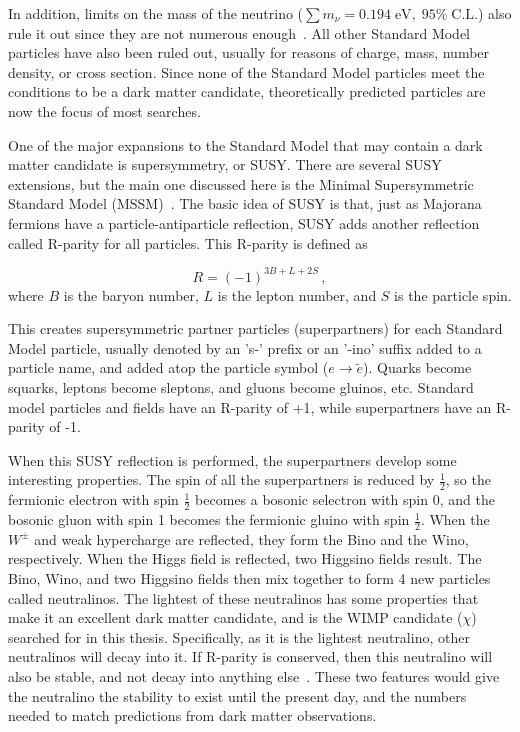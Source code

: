 In addition, limits on the mass of the neutrino ($\sum{}m_{\nu} = 0.194 \; \textrm{eV}, \; 95\% \; \textrm{C.L.}$) also rule it out since they are not numerous enough~\cite{planck2015}.
All other Standard Model particles have also been ruled out, usually for reasons of charge, mass, number density, or cross section.
Since none of the Standard Model particles meet the conditions to be a dark matter candidate, theoretically predicted particles are now the focus of most searches.

One of the major expansions to the Standard Model that may contain a dark matter candidate is supersymmetry, or SUSY.
There are several SUSY extensions, but the main one discussed here is the Minimal Supersymmetric Standard Model (MSSM)~\cite{MSSM,supersym1,schelke_thesis}.
The basic idea of SUSY is that, just as Majorana fermions have a particle-antiparticle reflection, SUSY adds another reflection called R-parity for all particles. 
This R-parity is defined as

\begin{equation}
  R = (-1)^{3B+L+2S} \,,
\end{equation}
where $B$ is the baryon number, $L$ is the lepton number, and $S$ is the particle spin.

This creates supersymmetric partner particles (superpartners) for each Standard Model particle, usually denoted by an 's-' prefix or an '-ino' suffix added to a particle name, and \nicetilde{} added atop the particle symbol ($e \rightarrow \tilde{e}$).
Quarks become squarks, leptons become sleptons, and gluons become gluinos, etc.
Standard model particles and fields have an R-parity of +1, while superpartners have an R-parity of -1.

When this SUSY reflection is performed, the superpartners develop some interesting properties.
The spin of all the superpartners is reduced by $\frac{1}{2}$, so the fermionic electron with spin $\frac{1}{2}$ becomes a bosonic selectron with spin $0$, and the bosonic gluon with spin 1 becomes the fermionic gluino with spin $\frac{1}{2}$.
When the $W^{\pm}$  and weak hypercharge are reflected, they form the Bino and the Wino, respectively.
When the Higgs field is reflected, two Higgsino fields result.
The Bino, Wino, and two Higgsino fields then mix together to form 4 new particles called neutralinos.
The lightest of these neutralinos has some properties that make it an excellent dark matter candidate, and is the WIMP candidate ($\chi$) searched for in this thesis.
Specifically, as it is the lightest neutralino, other neutralinos will decay into it.
If R-parity is conserved, then this neutralino will also be stable, and not decay into anything else~\cite{neutralino1,neutralino2,neutralino3}.
These two features would give the neutralino the stability to exist until the present day, and the numbers needed to match predictions from dark matter observations.

